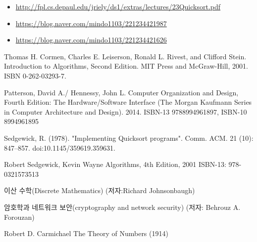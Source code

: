 \begin{itemize}
    \item \url{http://fpl.cs.depaul.edu/jriely/ds1/extras/lectures/23Quicksort.pdf}
    \item \url{ https://blog.naver.com/mindo1103/221234421987}\\
    \item \url{https://blog.naver.com/mindo1103/221234421626}
\end{itemize}



\begin{thebibliography}{}
    Thomas H. Cormen, Charles E. Leiserson, Ronald L. Rivest, and Clifford Stein. Introduction to Algorithms, Second Edition. MIT Press and McGraw-Hill, 2001. ISBN 0-262-03293-7.
    
    Patterson, David A./ Hennessy, John L. Computer Organization and Design, Fourth Edition: The Hardware/Software Interface (The Morgan Kaufmann Series in Computer Architecture and Design). 2014. ISBN-13 9788994961897, ISBN-10 8994961895

    Sedgewick, R. (1978). "Implementing Quicksort programs". Comm. ACM. 21 (10): 847–857. doi:10.1145/359619.359631.

    Robert Sedgewick, Kevin Wayne Algorithms, 4th Edition, 2001 ISBN-13: 978-0321573513

     이산 수학(Discrete Mathematics) (저자:Richard Johnsonbaugh)

     암호학과 네트워크 보안(cryptography and network security) (저자: Behrouz A. Forouzan)

    
    Robert D. Carmichael The Theory of Numbers (1914) 

\end{thebibliography}

